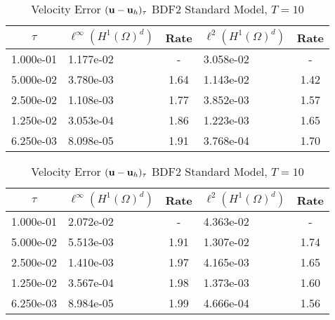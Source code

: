 \documentclass[letterpaper]{erdc}
\begin{document}
\begin{table}[h!]
  \parbox{.45\linewidth}{
  \tiny
  \centering
    \caption{Velocity Error $(\textbf{u} - \textbf{u}_h)_{\tau}$ BDF2 Rotational Model, $T=10$}
    \begin{tabular}{c|l|c|l|c}
      $\tau$ &  $\ell^{\infty}\left(H^1(\Omega)^d\right)$ &  Rate  &  $\ell^2\left(H^1(\Omega)^d\right)$  &  Rate\\
      \hline
      1.000e-01 & 1.177e-02 &  -   & 3.058e-02 &  -  \\
      5.000e-02 & 3.780e-03 & 1.64 & 1.143e-02 & 1.42\\
      2.500e-02 & 1.108e-03 & 1.77 & 3.852e-03 & 1.57\\
      1.250e-02 & 3.053e-04 & 1.86 & 1.223e-03 & 1.65\\
      6.250e-03 & 8.098e-05 & 1.91 & 3.768e-04 & 1.70
    \end{tabular}
    }
    \hfill
    \parbox{.45\linewidth}{
    \tiny
    \centering
      \caption{Velocity Error $(\textbf{u} - \textbf{u}_h)_{\tau}$ BDF2 Standard Model, $T=10$}
      \begin{tabular}{c|l|c|l|c}
        $\tau$ &  $\ell^{\infty}\left(H^1(\Omega)^d\right)$ &  Rate  &  $\ell^2\left(H^1(\Omega)^d\right)$  &  Rate\\
        \hline
        1.000e-01 & 2.072e-02 &  -   & 4.363e-02 &  -  \\
        5.000e-02 & 5.513e-03 & 1.91 & 1.307e-02 & 1.74\\
        2.500e-02 & 1.410e-03 & 1.97 & 4.165e-03 & 1.65\\
        1.250e-02 & 3.567e-04 & 1.98 & 1.373e-03 & 1.60\\
        6.250e-03 & 8.984e-05 & 1.99 & 4.666e-04 & 1.56
      \end{tabular}\tiny
    }
\end{table}
\end{document}
